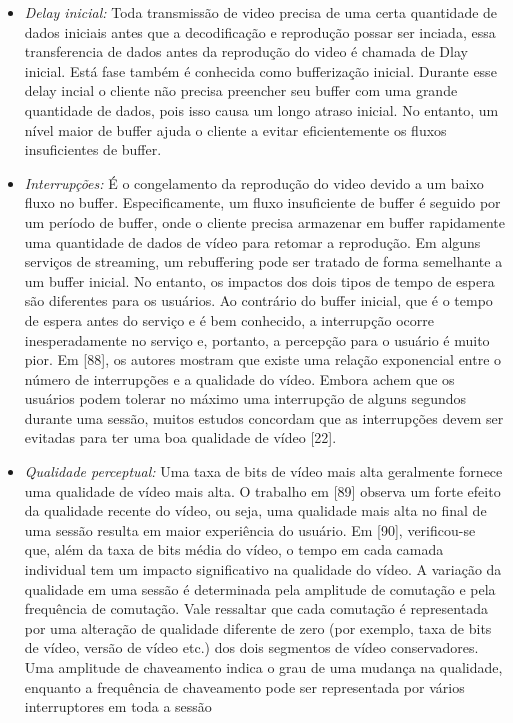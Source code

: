 \begin{itemize}

\item \textit{Delay inicial:} Toda transmissão de video precisa de uma certa quantidade de dados iniciais antes que a decodificação e reprodução possar ser inciada, essa transferencia de dados antes da reprodução do video é chamada de Dlay inicial. Está fase também é conhecida como bufferização inicial. Durante esse delay incial o cliente não precisa preencher seu buffer com uma grande quantidade de dados, pois isso causa um longo atraso inicial. No entanto, um nível maior de buffer ajuda o cliente a evitar eficientemente os fluxos insuficientes de buffer.

\item \textit{Interrupções:} É o congelamento da reprodução do video devido a um baixo fluxo no buffer. Especificamente, um fluxo insuficiente de buffer é seguido por um período de buffer, onde o cliente precisa armazenar em buffer rapidamente uma quantidade de dados de vídeo para retomar a reprodução. Em alguns serviços de streaming, um rebuffering pode ser tratado de forma semelhante a um buffer inicial. No entanto, os impactos dos dois tipos de tempo de espera são diferentes para os usuários. Ao contrário do buffer inicial, que é o tempo de espera antes do serviço e é bem conhecido, a interrupção ocorre inesperadamente no serviço e, portanto, a percepção para o usuário é muito pior. Em [88], os autores mostram que existe uma relação exponencial entre o número de interrupções e a qualidade do vídeo. Embora achem que os usuários podem tolerar no máximo uma interrupção de alguns segundos durante uma sessão, muitos estudos concordam que as interrupções devem ser evitadas para ter uma boa qualidade de vídeo [22].

\item \textit{Qualidade perceptual:}
Uma taxa de bits de vídeo mais alta geralmente fornece uma qualidade de vídeo mais alta. O trabalho em [89] observa um forte efeito da qualidade recente do vídeo, ou seja, uma qualidade mais alta no final de uma sessão resulta em maior experiência do usuário.
Em [90], verificou-se que, além da taxa de bits média do vídeo, o tempo em cada camada individual tem um impacto significativo na qualidade do vídeo.
A variação da qualidade em uma sessão é determinada pela amplitude de comutação e pela frequência de comutação. Vale ressaltar que cada comutação é representada por uma alteração de qualidade diferente de zero (por exemplo, taxa de bits de vídeo, versão de vídeo etc.) dos dois segmentos de vídeo conservadores. Uma amplitude de chaveamento indica o grau de uma mudança na qualidade, enquanto a frequência de chaveamento pode ser representada por vários interruptores em toda a sessão


\end{itemize}
